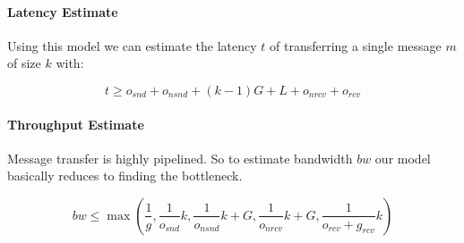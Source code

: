 \paragraph{Latency Estimate}

Using this model we can estimate the latency $t$ of transferring a single message $m$ of size $k$ with:

$$
t \geq o_{snd} + o_{nsnd}  + (k-1)G + L + o_{nrcv} + o_{rcv}
$$


\paragraph{Throughput Estimate}

Message transfer is highly pipelined. So to estimate bandwidth $bw$ our model basically reduces to finding the bottleneck.

$$
bw \leq \max (\frac{1}{g}, \frac{1}{o_{snd}}k, \frac{1}{o_{nsnd}}k + G, \frac{1}{o_{nrcv}}k + G, \frac{1}{o_{rcv} + g_{rcv}}k)
$$
